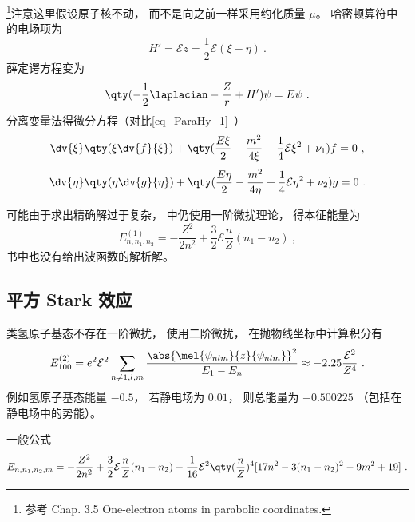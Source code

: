 
\begin{issues}
\issueDraft
\end{issues}


\footnote{参考 \cite{Bransden} Chap. 3.5 One-electron atoms in parabolic coordinates.}注意这里假设原子核不动， 而不是向之前一样采用约化质量 $\mu$。 哈密顿算符中的电场项为
\begin{equation}
H' = \mathcal Ez = \frac12 \mathcal E (\xi - \eta)~.
\end{equation}
薛定谔方程变为
\begin{equation}
\qty(-\frac12 \laplacian - \frac{Z}{r} + H')\psi = E\psi~.
\end{equation}
分离变量法得微分方程（对比\autoref{eq_ParaHy_1}~）
\begin{equation}
\dv{\xi} \qty(\xi \dv{f}{\xi}) + \qty(\frac{E \xi}{2} - \frac{m^2}{4\xi} -\frac14\mathcal E \xi^2 + \nu_1) f = 0~,
\end{equation}
\begin{equation}
\dv{\eta}\qty(\eta \dv{g}{\eta}) + \qty(\frac{E\eta}{2} - \frac{m^2}{4\eta} +\frac14\mathcal E \eta^2 + \nu_2)g = 0~.
\end{equation}

可能由于求出精确解过于复杂， \cite{Bransden} 中仍使用一阶微扰理论， 得本征能量为
\begin{equation}
E_{n,n_1,n_2}^{(1)} = -\frac{Z^2}{2n^2} + \frac32 \mathcal E \frac{n}{Z}(n_1 - n_2)~,
\end{equation}
书中也没有给出波函数的解析解。

\subsection{平方 Stark 效应}
类氢原子基态不存在一阶微扰， 使用二阶微扰， 在抛物线坐标中计算积分有
\begin{equation}
E_{100}^{(2)} = e^2\mathcal E^2 \sum_{n\ne 1, l, m} \frac{\abs{\mel{\psi_{nlm}}{z}{\psi_{nlm}}}^2}{E_1 - E_n}
\approx - 2.25\frac{\mathcal E^2}{Z^4}~.
\end{equation}
例如氢原子基态能量 $-0.5$， 若静电场为 $0.01$， 则总能量为 $-0.500225$ （包括在静电场中的势能）。

一般公式
\begin{equation}
E_{n,n_1,n_2,m} = -\frac{Z^2}{2n^2} + \frac32 \mathcal E \frac{n}{Z} (n_1-n_2)
-\frac{1}{16}\mathcal E^2 \qty(\frac{n}{Z})^4 [17n^2-3(n_1-n_2)^2-9m^2+19]~.
\end{equation}
